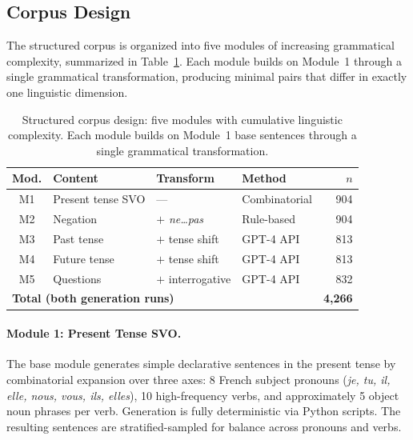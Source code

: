 \documentclass[11pt]{article}
\begin{document}
\subsection{Corpus Design}
\label{sec:corpus-design}

The structured corpus is organized into five modules of increasing grammatical complexity, summarized in Table~\ref{tab:modules}. Each module builds on Module~1 through a single grammatical transformation, producing minimal pairs that differ in exactly one linguistic dimension.

\begin{table}[t]
\centering
\small
\caption{Structured corpus design: five modules with cumulative linguistic complexity. Each module builds on Module~1 base sentences through a single grammatical transformation.}
\label{tab:modules}
\begin{tabular}{clllr}
\toprule
\textbf{Mod.} & \textbf{Content} & \textbf{Transform} & \textbf{Method} & \textbf{$n$} \\
\midrule
M1 & Present tense SVO     & ---               & Combinatorial & 904 \\
M2 & Negation              & $+$ \emph{ne\ldots pas} & Rule-based    & 904 \\
M3 & Past tense            & $+$ tense shift   & GPT-4 API\footnotemark & 813 \\
M4 & Future tense          & $+$ tense shift   & GPT-4 API     & 813 \\
M5 & Questions             & $+$ interrogative  & GPT-4 API     & 832 \\
\midrule
\multicolumn{4}{l}{\textbf{Total (both generation runs)}} & \textbf{4,266} \\
\bottomrule
\end{tabular}
\end{table}

\paragraph{Module 1: Present Tense SVO.} The base module generates simple declarative sentences in the present tense by combinatorial expansion over three axes: 8 French subject pronouns (\emph{je, tu, il, elle, nous, vous, ils, elles}), 10 high-frequency verbs, and approximately 5 object noun phrases per verb. Generation is fully deterministic via Python scripts. The resulting sentences are stratified-sampled for balance across pronouns and verbs.
\end{document}
